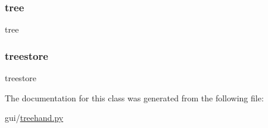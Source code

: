 \subsubsection{\texorpdfstring{tree}{tree}}
{\footnotesize\ttfamily tree}

\mbox{\label{classtreehand_1_1_tree_hand_a555b9539fb020fe8fb52e7c61eceda72}} 
\subsubsection{\texorpdfstring{treestore}{treestore}}
{\footnotesize\ttfamily treestore}



The documentation for this class was generated from the following file\+:\begin{DoxyCompactItemize}
\item 
gui/\hyperlink{treehand_8py}{treehand.\+py}\end{DoxyCompactItemize}
